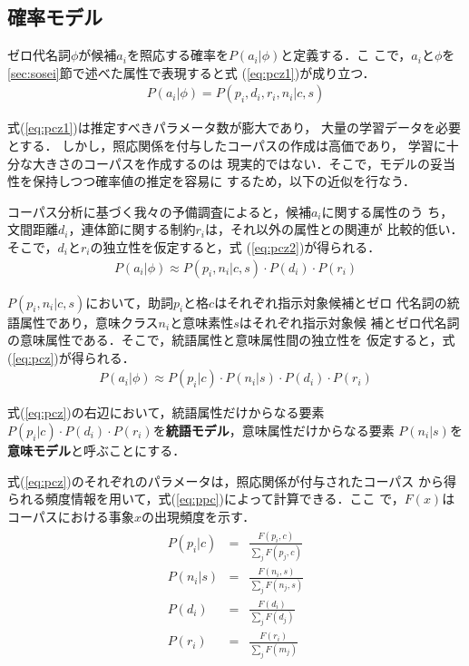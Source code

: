 \subsection{確率モデル}
\label{sec:kakuritu}

ゼロ代名詞$\phi$が候補$a_i$を照応する確率を$P(a_i|\phi)$と定義する．こ
こで，$a_i$と$\phi$を\ref{sec:sosei}節で述べた属性で表現すると式
(\ref{eq:pcz1})が成り立つ．
\begin{eqnarray}
  \label{eq:pcz1}
  P(a_i|\phi) = P(p_i,d_i,r_i,n_i|c,s)
\end{eqnarray}

\noindent
式(\ref{eq:pcz1})は推定すべきパラメータ数が膨大であり，
大量の学習データを必要とする．
しかし，照応関係を付与したコーパスの作成は高価であり，
学習に十分な大きさのコーパスを作成するのは
現実的ではない．そこで，モデルの妥当性を保持しつつ確率値の推定を容易に
するため，以下の近似を行なう．

コーパス分析に基づく我々の予備調査によると，候補$a_i$に関する属性のう
ち，文間距離$d_i$，連体節に関する制約$r_i$は，それ以外の属性との関連が
比較的低い．そこで，$d_i$と$r_i$の独立性を仮定すると，式
(\ref{eq:pcz2})が得られる．
\begin{eqnarray}
  \label{eq:pcz2}
  P(a_i|\phi)\approx P(p_i,n_i|c,s)\cdot P(d_i) \cdot P(r_i)
\end{eqnarray}

\noindent 
$P(p_i,n_i|c,s)$において，助詞$p_i$と格$c$はそれぞれ指示対象候補とゼロ
代名詞の統語属性であり，意味クラス$n_i$と意味素性$s$はそれぞれ指示対象候
補とゼロ代名詞の意味属性である．そこで，統語属性と意味属性間の独立性を
仮定すると，式(\ref{eq:pcz})が得られる．
\begin{eqnarray}
  \label{eq:pcz}
  P(a_i|\phi) \approx P(p_i|c)\cdot P(n_i|s)\cdot P(d_i)\cdot P(r_i)
\end{eqnarray}

\noindent
式(\ref{eq:pcz})の右辺において，統語属性だけからなる要素$P(p_i|c)\cdot
P(d_i)\cdot P(r_i)$を{\bf 統語モデル}，意味属性だけからなる要素
$P(n_i|s)$を{\bf 意味モデル}と呼ぶことにする．

式(\ref{eq:pcz})のそれぞれのパラメータは，照応関係が付与されたコーパス
から得られる頻度情報を用いて，式(\ref{eq:ppc})によって計算できる．ここ
で，$F(x)$はコーパスにおける事象$x$の出現頻度を示す．
\begin{eqnarray}
  \label{eq:ppc}
  \begin{array}{rcl}
    P(p_i|c)&=&\displaystyle\frac{F(p_i,c)}{\sum_{j}F(p_j,c)}\\
    \label{eq:pns}
    P(n_i|s)&=&\displaystyle\frac{F(n_i,s)}{\sum_{j}F(n_j,s)}\\
    \label{eq:pd}
    P(d_i)&=&\displaystyle\frac{F(d_i)}{\sum_{j}F(d_j)}\\
    \label{eq:pm}
    P(r_i)&=&\displaystyle\frac{F(r_i)}{\sum_{j}F(m_j)}
  \end{array}
\end{eqnarray}

